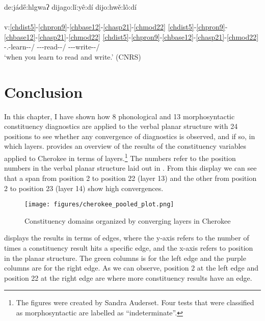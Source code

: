 \documentclass[output=paper]{langscibook}
\begin{document}
\ea\label{bkm:Ref101359093}de:jád\H{e}:hlgwaʔ dijago:lǐ:yê:dí dijo:hwě:lô:dí \\
\\
v:\ref{chdist5}-\ref{chpron9}-\ref{chbase12}-\ref{chasp21}-\ref{chmod22} \ref{chdist5}-\ref{chpron9}-\ref{chbase12}-\ref{chasp21}-\ref{chmod22} \ref{chdist5}-\ref{chpron9}-\ref{chbase12}-\ref{chasp21}-\ref{chmod22}\\
\Dist-\Second\Sg.\Barg{}-learn-\Prf{}-\Ind/\Sh{} \Dist-\Second\Sg-\Barg{}-read-\Inf{}-\Nom/\Sh{} \Dist-\Second\Sg-\Barg{}-write-\Inf{}-\Nom/\Sh{}\\
\glt `when you learn to read and write.' (CNRS)
\z 

\section{Conclusion}
\label{bkm:Ref87347176}
In this chapter, I have shown how 8 phonological and 13 morphosyntactic constituency diagnostics are applied to the verbal planar structure with 24 positions to see whether any convergence of diagnostics is observed, and if so, in which layers.  provides an overview of the results of the constituency variables applied to Cherokee in terms of layers.\footnote{The figures were created by Sandra Auderset. Four tests that were classified as morphosyntactic are labelled as ``indeterminate''.}  The numbers refer to the position numbers in the verbal planar structure laid out in . From this display we can see that a span from position 2 to position 22  (layer 13) and the other from position 2 to position 23 (layer 14) show high convergences.

\begin{figure}
    \centering
    \texttt{[image: figures/cherokee\_pooled\_plot.png]}
    \caption{Constituency domains organized by converging layers in Cherokee}
    \label{fig:pooled}
\end{figure}


 displays the results in terms of edges, where the y-axis refers to the number of times a constituency result hits a specific edge, and the x-axis refers to position in the planar structure. The green columns is for the left edge and the purple columns are for the right edge. As we can observe, position 2 at the left edge and position 22 at the right edge are where more constituency results have an edge.
\end{document}
